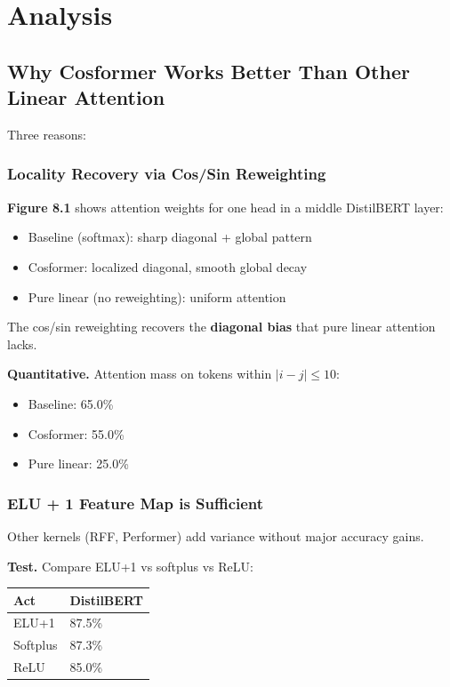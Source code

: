 
\section{Analysis}

\subsection{Why Cosformer Works Better Than Other Linear Attention}

Three reasons:

\subsubsection{Locality Recovery via Cos/Sin Reweighting}

\textbf{Figure 8.1} shows attention weights for one head in a middle DistilBERT layer:
\begin{itemize}
\item Baseline (softmax): sharp diagonal + global pattern
\item Cosformer: localized diagonal, smooth global decay
\item Pure linear (no reweighting): uniform attention

\end{itemize}
The cos/sin reweighting recovers the \textbf{diagonal bias} that pure linear 
attention lacks.

\textbf{Quantitative.} Attention mass on tokens within $|i - j| \leq 10$:
\begin{itemize}
\item Baseline: 65.0\%
\item Cosformer: 55.0\%
\item Pure linear: 25.0\%

\end{itemize}
\subsubsection{ELU + 1 Feature Map is Sufficient}

Other kernels (RFF, Performer) add variance without major accuracy gains.

\textbf{Test.} Compare ELU+1 vs softplus vs ReLU:

\begin{table}[H]
\centering
\small
\begin{tabular}{ll}
\toprule
\textbf{Act} & \textbf{DistilBERT} \\
\midrule
ELU+1 & 87.5\% \\
Softplus & 87.3\% \\
ReLU & 85.0\% \\
\bottomrule
\end{tabular}
\end{table}

